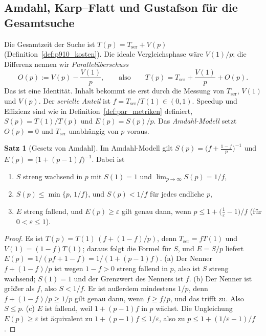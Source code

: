 \documentclass[a4paper,12pt, twoside]{report}
\theoremstyle{definition}
\newtheorem{satz}{Satz}
\begin{document}
\subsection{Amdahl, Karp--Flatt und Gustafson für die Gesamtsuche}
\label{sec:p910_amdahl}

Die Gesamtzeit der Suche ist $T(p)=T_{\mathrm{ser}}+V(p)$ (Definition~\ref{def:p910_kosten}). Die ideale Vergleichsphase wäre $V(1)/p$; die Differenz nennen wir \emph{Parallelüberschuss}
\[
O(p):=V(p)-\frac{V(1)}{p},\qquad\text{also}\qquad T(p)=T_{\mathrm{ser}}+\frac{V(1)}{p}+O(p).
\]
Das ist eine Identität. Inhalt bekommt sie erst durch die Messung von $T_{\mathrm{ser}}$, $V(1)$ und $V(p)$. Der \emph{serielle Anteil} ist $f=T_{\mathrm{ser}}/T(1)\in(0,1)$. Speedup und Effizienz sind wie in Definition~\ref{def:par_metriken} definiert, $S(p)=T(1)/T(p)$ und $E(p)=S(p)/p$. Das \emph{Amdahl-Modell} setzt $O(p)=0$ und $T_{\mathrm{ser}}$ unabhängig von $p$ voraus.

\begin{satz}[Gesetz von Amdahl]
\label{satz:p910_amdahl}
Im Amdahl-Modell gilt $S(p)=\bigl(f+\tfrac{1-f}{p}\bigr)^{-1}$ und $E(p)=\bigl(1+(p-1)f\bigr)^{-1}$. Dabei ist
\begin{enumerate}[label=(\alph*)]
\item $S$ streng wachsend in $p$ mit $S(1)=1$ und $\lim_{p\to\infty}S(p)=1/f$,
\item $S(p)\le\min\{p,\,1/f\}$, und $S(p)<1/f$ für jedes endliche $p$,
\item $E$ streng fallend, und $E(p)\ge\varepsilon$ gilt genau dann, wenn $p\le 1+\bigl(\tfrac1\varepsilon-1\bigr)/f$ (für $0<\varepsilon\le 1$).
\end{enumerate}
\end{satz}

\begin{proof}
Es ist $T(p)=T(1)\,(f+(1-f)/p)$, denn $T_{\mathrm{ser}}=fT(1)$ und $V(1)=(1-f)T(1)$; daraus folgt die Formel für $S$, und $E=S/p$ liefert $E(p)=1/(pf+1-f)=1/(1+(p-1)f)$.
(a) Der Nenner $f+(1-f)/p$ ist wegen $1-f>0$ streng fallend in $p$, also ist $S$ streng wachsend; $S(1)=1$ und der Grenzwert des Nenners ist $f$.
(b) Der Nenner ist größer als $f$, also $S<1/f$. Er ist außerdem mindestens $1/p$, denn $f+(1-f)/p\ge 1/p$ gilt genau dann, wenn $f\ge f/p$, und das trifft zu. Also $S\le p$.
(c) $E$ ist fallend, weil $1+(p-1)f$ in $p$ wächst. Die Ungleichung $E(p)\ge\varepsilon$ ist äquivalent zu $1+(p-1)f\le 1/\varepsilon$, also zu $p\le 1+(1/\varepsilon-1)/f$.
\end{proof}
\end{document}
